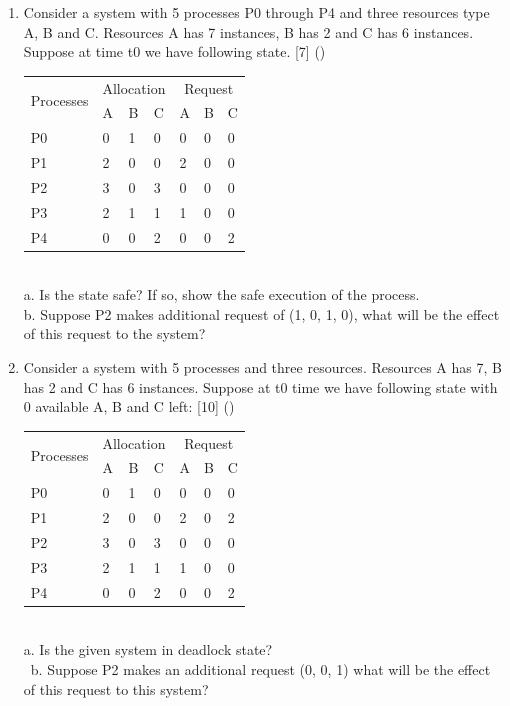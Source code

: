 \documentclass[12pt]{article}
\begin{document}
\begin{enumerate}
			\item Consider a system with 5 processes P0 through P4 and three resources type A, B and C. Resources A has 7 instances, B has 2 and C has 6 instances. Suppose at time t0 we have following state. \hfill [7] ()
			\begin{tabular}{|p{17mm}|p{7mm}|p{7mm}|p{7mm}|p{7mm}|p{7mm}|p{7mm}|}
				\hline
				\multirow{2}{*}{Processes} & \multicolumn{3}{|c|}{Allocation} & \multicolumn{3}{|c|}{Request} \\ \cline{2-7}
				& A & B & C & A & B & C \\ \hline
				P0 & 0 & 1 & 0 & 0 & 0 & 0 \\ \hline
				P1 & 2 & 0 & 0 & 2 & 0 & 0 \\ \hline
				P2 & 3 & 0 & 3 & 0 & 0 & 0 \\ \hline
				P3 & 2 & 1 & 1 & 1 & 0 & 0 \\ \hline
				P4 & 0 & 0 & 2 & 0 & 0 & 2 \\ \hline
			\end{tabular}\\
			a. Is the state safe? If so, show the safe execution of the process.\\
			b. Suppose P2 makes additional request of (1, 0, 1, 0), what will be the effect of this request to the system?

			\item Consider a system with 5 processes and three resources. Resources A has 7, B has 2 and C has 6 instances. Suppose at t0 time we have following state with 0 available A, B and C left: \hfill [10] (\bo{71 Bh})\\
			\begin{tabular}{|p{17mm}|p{7mm}|p{7mm}|p{7mm}|p{7mm}|p{7mm}|p{7mm}|}
				\hline
				\multirow{2}{*}{Processes} & \multicolumn{3}{|c|}{Allocation} & \multicolumn{3}{|c|}{Request} \\ \cline{2-7}
				& A & B & C & A & B & C \\ \hline
				P0 & 0 & 1 & 0 & 0 & 0 & 0 \\ \hline
				P1 & 2 & 0 & 0 & 2 & 0 & 2 \\ \hline
				P2 & 3 & 0 & 3 & 0 & 0 & 0 \\ \hline
				P3 & 2 & 1 & 1 & 1 & 0 & 0 \\ \hline
				P4 & 0 & 0 & 2 & 0 & 0 & 2 \\ \hline
			\end{tabular}\\
			a. Is the given system in deadlock state?\\\
			b. Suppose P2 makes an additional request (0, 0, 1) what will be the effect of this request to this system?


\end{enumerate}
\end{document}
